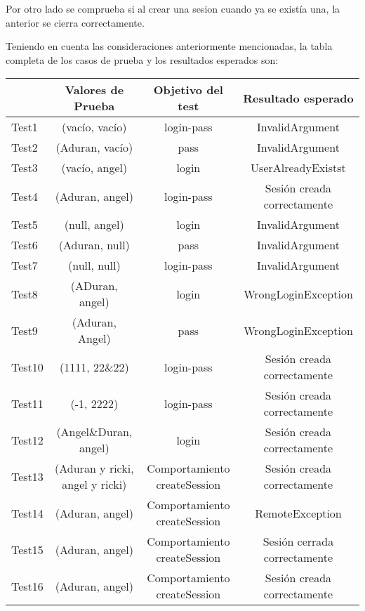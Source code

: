 Por otro lado se comprueba si al crear una sesion cuando ya se existía una, la anterior se cierra correctamente.


Teniendo en cuenta las consideraciones anteriormente mencionadas, la tabla completa de los casos de prueba y los resultados esperados son:

{\footnotesize
\begin{longtable}[c]{lccc}
 & \textbf{Valores de Prueba} & \textbf{Objetivo del test} & \textbf{Resultado esperado} \\
\hline \hline
\endhead

Test1 & (vacío, vacío)  & login-pass & InvalidArgument\\
Test2 & (Aduran, vacío) & pass & InvalidArgument\\
Test3 & (vacío, angel) & login & UserAlreadyExistst\\
Test4 & (Aduran, angel) & login-pass   & Sesión creada correctamente\\
Test5 & (null, angel) & login   & InvalidArgument\\
Test6 & (Aduran, null) & pass   & InvalidArgument\\
Test7 & (null, null) & login-pass   & InvalidArgument\\
Test8 & (ADuran, angel) & login & WrongLoginException\\
Test9 & (Aduran, Angel) & pass & WrongLoginException\\
Test10 & (1111, 22\&22) & login-pass & Sesión creada correctamente\\
Test11& (-1, 2222) & login-pass  & Sesión creada correctamente\\
Test12& (Angel\&Duran, angel) & login  &  Sesión creada correctamente \\
Test13 & (Aduran y ricki, angel y ricki) & Comportamiento createSession & Sesión creada correctamente\\
Test14 & (Aduran, angel) & Comportamiento createSession & RemoteException\\
Test15 & (Aduran, angel) & Comportamiento createSession & Sesión cerrada correctamente\\
Test16 & (Aduran, angel) & Comportamiento createSession & Sesión creada correctamente\\

\hline
\end{longtable}
}
